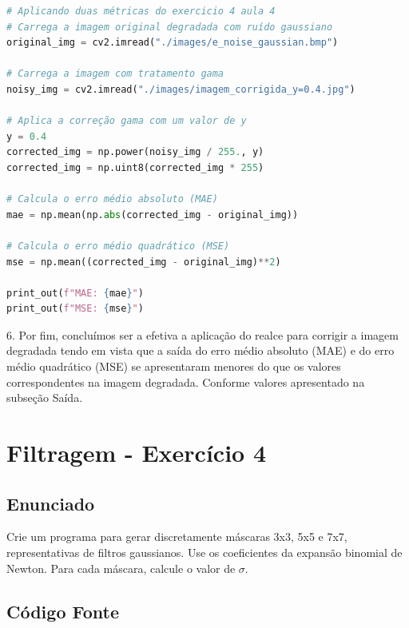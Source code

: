 \documentclass[10pt,a4paper]{article}
\begin{document}
\begin{lstlisting}[language=Python]
# Aplicando duas métricas do exercicio 4 aula 4
# Carrega a imagem original degradada com ruído gaussiano
original_img = cv2.imread("./images/e_noise_gaussian.bmp")

# Carrega a imagem com tratamento gama
noisy_img = cv2.imread("./images/imagem_corrigida_y=0.4.jpg")

# Aplica a correção gama com um valor de y
y = 0.4
corrected_img = np.power(noisy_img / 255., y)
corrected_img = np.uint8(corrected_img * 255)

# Calcula o erro médio absoluto (MAE)
mae = np.mean(np.abs(corrected_img - original_img))

# Calcula o erro médio quadrático (MSE)
mse = np.mean((corrected_img - original_img)**2)

print_out(f"MAE: {mae}")
print_out(f"MSE: {mse}")
\end{lstlisting}

\begin{flushleft}
6.	Por fim, concluímos ser a efetiva a aplicação do realce para corrigir a imagem degradada tendo em vista que a saída do erro médio absoluto (MAE) e do erro médio quadrático (MSE)  se apresentaram menores do que os valores correspondentes na imagem degradada. Conforme valores apresentado na subseção Saída.
\end{flushleft}

\pagebreak

\section{Filtragem - Exercício 4}

\subsection{Enunciado}

\begin{flushleft}
Crie um programa para gerar discretamente máscaras 3x3, 5x5 e 7x7, representativas de filtros gaussianos. Use os coeficientes da expansão binomial de Newton. Para cada máscara, calcule o valor de \({\sigma}\).
\end{flushleft}

\subsection {Código Fonte}


\end{document}
